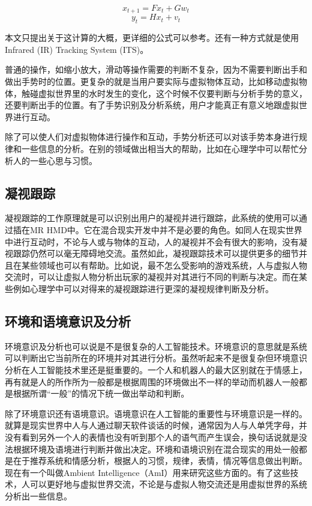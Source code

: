 \documentclass{llncs}
\begin{document}
\begin{equation}\label{fingertips-framevec}
x_{t+1} = Fx_{t} + Gw_{t}
\end{equation}
\begin{equation}\label{fingertips-predictvec}
y_{t} = Hx_{t} + v_{t}
\end{equation}

本文只提出关于这计算的大概，更详细的公式可以参考\cite{oka2002real}。还有一种方式就是使用Infrared (IR) Tracking System (ITS)\cite{storring2004computer}。

普通的操作，如缩小放大，滑动等操作需要的判断不复杂，因为不需要判断出手和做出手势时的位置。更复杂的就是当用户要实际与虚拟物体互动，比如移动虚拟物体，触碰虚拟世界里的水时发生的变化，这个时候不仅要判断与分析手势的意义，还要判断出手的位置。有了手势识别及分析系统，用户才能真正有意义地跟虚拟世界进行互动。

除了可以使人们对虚拟物体进行操作和互动，手势分析还可以对该手势本身进行规律和一些信息的分析。在别的领域做出相当大的帮助，比如在心理学中可以帮忙分析人的一些心思与习惯。

\subsection{凝视跟踪}
凝视跟踪的工作原理就是可以识别出用户的凝视并进行跟踪，此系统的使用可以通过插在MR HMD中\cite{lewis2013gaze}。它在混合现实开发中并不是必要的角色。如同人在现实世界中进行互动时，不论与人或与物体的互动，人的凝视并不会有很大的影响，没有凝视跟踪仍然可以毫无障碍地交流。虽然如此，凝视跟踪技术可以提供更多的细节并且在某些领域也可以有帮助。比如说，最不怎么受影响的游戏系统，人与虚拟人物交流时，可以让虚拟人物分析出玩家的凝视并对其进行不同的判断与决定。而在某些例如心理学中可以对得来的凝视跟踪进行更深的凝视规律判断及分析。

\subsection{环境和语境意识及分析}
环境意识及分析也可以说是不是很复杂的人工智能技术。环境意识的意思就是系统可以判断出它当前所在的环境并对其进行分析。虽然听起来不是很复杂但环境意识分析在人工智能技术里还是挺重要的。一个人和机器人的最大区别就在于情感上，再有就是人的所作所为一般都是根据周围的环境做出不一样的举动而机器人一般都是根据所谓“一般”的情况下统一做出举动和判断。

除了环境意识还有语境意识\cite{abowd1999towards}。语境意识在人工智能的重要性与环境意识是一样的。就算是现实世界中人与人通过聊天软件谈话的时候，通常因为人与人单凭字母，并没有看到另外一个人的表情也没有听到那个人的语气而产生误会，换句话说就是没法根据环境及语境进行判断并做出决定。环境和语境识别在混合现实的用处一般都是在于推荐系统和情感分析，根据人的习惯，规律，表情，情况等信息做出判断。现在有一个叫做Ambient Intelligence（AmI）用来研究这些方面的\cite{DBLP:conf/epia/CostaNNMLA07}。有了这些技术，人可以更好地与虚拟世界交流，不论是与虚拟人物交流还是用虚拟世界的系统分析出一些信息。
\end{document}

